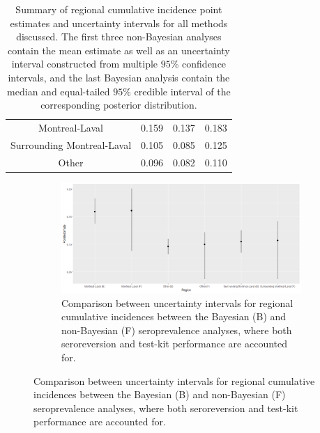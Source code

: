 \begin{table}[]
\begin{tabular}{c|ccc}
Montreal-Laval             & 0.159               & 0.137                  & 0.183                  \\
Surrounding Montreal-Laval & 0.105               & 0.085                  & 0.125                  \\
Other                      & 0.096               & 0.082                  & 0.110                 
\end{tabular}
\caption{Summary of regional cumulative incidence point estimates and uncertainty intervals for all methods discussed. The first three non-Bayesian analyses contain the mean estimate as well as an uncertainty interval constructed from multiple $95$\% confidence intervals, and the last Bayesian analysis contain the median and equal-tailed $95$\% credible interval of the corresponding posterior distribution.}
\end{table}

\captionsetup[subfigure]{labelformat=empty}
\begin{figure}[ht!]
\centering
\begin{subfigure}[b]{\columnwidth} 
    \includegraphics[width=\columnwidth]{../../plot/intervals.png}
    \caption{Comparison between uncertainty intervals for regional cumulative incidences between the Bayesian (B) and non-Bayesian (F) seroprevalence analyses, where both seroreversion and test-kit performance are accounted for.}
    \label{fig:intervals}
\end{subfigure}
\end{figure}